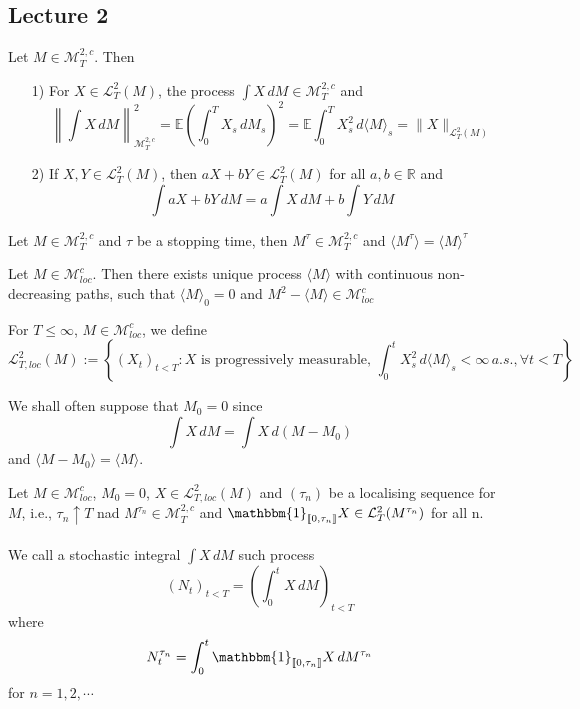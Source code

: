 \documentclass[12pt,a4paper]{article}
\newcommand{\R}{\mathbb{R}}
\newcommand{\E}{\mathbb{E}}
\begin{document}
\subsection{Lecture 2}
\begin{proposition}{}{}
    Let $M\in\mathcal{M}^{2,c}_T$. Then
    \begin{enumerate}
        \item[1)] For $X\in\mathcal{L}^2_T(M)$, the process $\int X\, dM\in \mathcal{M}^{2,c}_T$ and
        $$
        \left\|\int X\,dM\right\|^2_{\mathcal{M}^{2,c}_T} = \E\left(\int_0^T X_s\, dM_s\right)^2 = \E\int_0^T X_s^2\, d\langle M\rangle_s = \|X\|_{\mathcal{L}^2_T(M)}
        $$
        \item[2)] If $X,Y\in\mathcal{L}_T^2(M)$, then $aX+bY\in \mathcal{L}^2_T(M)$ for all $a,b\in\R$ and
        $$
        \int aX+bY \, dM = a\int X\,dM + b\int Y\, dM
        $$
    \end{enumerate}
\end{proposition}
\begin{proposition}{}{}
    Let $M\in\mathcal{M}^{2,c}_T$ and $\tau$ be a stopping time, then $M^\tau\in\mathcal{M}^{2,c}_T$ and $\langle M^\tau\rangle = \langle M\rangle^\tau$
\end{proposition}
\begin{corollary}{}{}
    Let $M\in \mathcal{M}^c_{loc}$. Then there exists unique process $\langle M\rangle$ with continuous non-decreasing paths, such that $\langle M\rangle_0 = 0$ and $M^2 - \langle M\rangle \in \mathcal{M}^c_{loc}$
\end{corollary}
\begin{definition}{}{}
    For $T\le \infty$, $M\in\mathcal{M}^c_{loc}$, we define
    $$
    \mathcal{L}^2_{T,loc} (M):= \left\{(X_t)_{t<T}: \text{$X$ is progressively measurable, } \int_0^t X_s^2\,d\langle M\rangle_s<\infty\, a.s., \forall t<T\right\}
    $$
\end{definition}
\begin{remark}{}{}
    We shall often suppose that $M_0=0$ since
    $$
    \int X\, dM = \int X\, d(M-M_0)
    $$
    and $\langle M-M_0\rangle =\langle M\rangle$.
\end{remark}
\begin{definition}{}{}
    Let $M\in\mathcal{M}_{loc}^c$, $M_0=0$, $X\in\mathcal{L}^2_{T,loc}(M)$ and $(\tau_n)$ be a localising sequence for $M$, i.e., $\tau_n\uparrow T$ nad $M^{\tau_n}\in \mathcal{M}^{2,c}_T$ and $\mathbbm{1}_{\llbracket 0,\tau_n\rrbracket} X\in \mathcal{L}^2_T(M^{\tau_n})$ for all n.\\
    \\
    We call a stochastic integral $\int X\, dM$ such process
    $$
    (N_t)_{t<T} = \left(\int_0^t X\, dM\right)_{t<T}
    $$
    where
    $$
    N^{\tau_n}_t = \int_0^t \mathbbm{1}_{\llbracket 0, \tau_n\rrbracket} X\, dM^{\tau_n}
    $$
    for $n=1,2,\cdots$
\end{definition}
\end{document}
